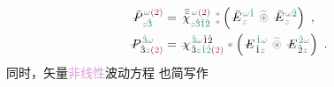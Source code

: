 \begin{subequations} \label{eq:DP^(2)-plane_wave_basis-3_12-spectrum}
\begin{align}
	\Xint{\mathcolor{gray}{-}}{30}{\bar{P}}^{\;\! \mathcolor{gray}{\omega} \textcolor{Maroon}{(2)} }_{\;\! \mathcolor{gray}{z} \textcolor{PineGreen}{\hat{3}}} &= \Xint{{}^{}_{\mathcolor{gray}{-}}}{23}{\bar{\bar{\bar{\chi}}}}^{\;\! \mathcolor{gray}{\omega} \textcolor{Maroon}{(2)}}_{\mathcolor{gray}{z} \textcolor{PineGreen}{\hat{3} \hat{1} \hat{2}} } ~{}^{\mathcolor{gray}{*}}_{\mathcolor{gray}{*}} \left( \Xint{\mathcolor{gray}{-}}{295}{\bar{E}}^{\;\! \mathcolor{gray}{\omega} \textcolor{PineGreen}{\hat{1}} }_{\;\! \mathcolor{gray}{z} } ~\mathcolor{gray}{\widetilde \circledast}~ \Xint{\mathcolor{gray}{-}}{295}{\bar{E}}^{\;\! \mathcolor{gray}{\omega} \textcolor{PineGreen}{\hat{2}} }_{\;\! \mathcolor{gray}{z} } \right) ~, \label{eq:vec-DP^(2)-plane_wave_basis-3_12-spectrum} \\
	\Xint{\mathcolor{gray}{-}}{30}{P}^{\;\! \textcolor{PineGreen}{\hat{3}} \mathcolor{gray}{\omega} }_{\;\! \hat{3}\mathcolor{gray}{z} \textcolor{Maroon}{(2)} } &= \Xint{{}^{}_{\mathcolor{gray}{-}}}{23}{\chi}^{\;\! \textcolor{PineGreen}{\hat{3}} \mathcolor{gray}{\omega} \hat{1} \hat{2} }_{\;\! \hat{3} \mathcolor{gray}{z} \textcolor{PineGreen}{\hat{1} \hat{2}} \textcolor{Maroon}{(2)}} \mathcolor{gray}{*} \left( \Xint{\mathcolor{gray}{-}}{295}{E}^{\;\! \textcolor{PineGreen}{\hat{1}} \mathcolor{gray}{\omega} }_{\;\! \hat{1} \mathcolor{gray}{z}} ~\mathcolor{gray}{\widetilde \circledast}~ \Xint{\mathcolor{gray}{-}}{295}{E}^{\;\! \textcolor{PineGreen}{\hat{2}} \mathcolor{gray}{\omega} }_{\;\! \hat{2} \mathcolor{gray}{z}} \right) ~. \label{eq:components-DP^(2)-plane_wave_basis-3_12-spectrum}
\end{align}
\end{subequations}
同时，矢量\textcolor{Plum}{非线性}波动方程  也简写作

